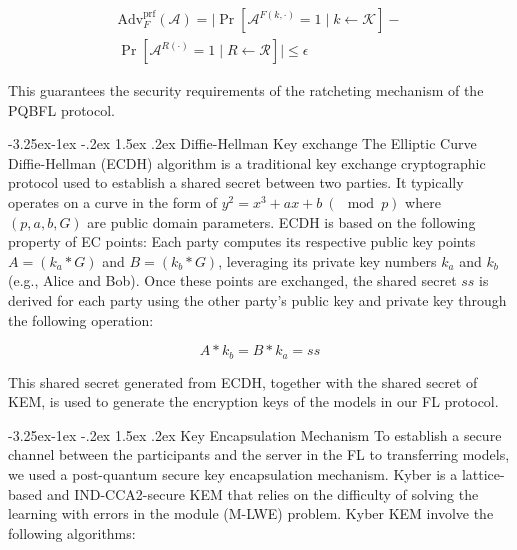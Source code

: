 \documentclass[a4paper,fleqn]{cas-dc}
\makeatletter
\renewcommand\subsubsection{\@startsection{subsubsection}{3}{\z@}%
   {-3.25ex\@plus -1ex \@minus -.2ex}%
   {1.5ex \@plus .2ex}%
   {\normalfont\normalsize}} %
\makeatother
\begin{document}
\begin{equation}
    \begin{aligned}
        \text{Adv}_{F}^{\text{prf}}(\mathcal{A}) = \Big| \Pr \left[ \mathcal{A}^{F(k, \cdot)} = 1 \mid k \leftarrow \mathcal{K} \right] - \\ 
        \Pr \left[ \mathcal{A}^{R(\cdot)} = 1 \mid R \leftarrow \mathcal{R} \right] \Big| \leq \epsilon 
    \end{aligned}
\end{equation}

This guarantees the security requirements of the ratcheting mechanism of the PQBFL protocol.

\subsubsection{Diffie-Hellman Key exchange}
The Elliptic Curve Diffie-Hellman (ECDH) algorithm is a traditional key exchange cryptographic protocol used to establish a shared secret between two parties.
It typically operates on a curve in the form of $y^2=x^3+ax+b\:(\!\!\!\!\mod {p})$ where $(p,a,b,G)$ are public domain parameters. 
ECDH is based on the following property of EC points: Each party computes its respective public key points $A=(k_{a} * G)$ and $B=(k_{b} * G)$, leveraging its private key numbers $k_{a}$ and $k_{b}$ (e.g., Alice and Bob).
Once these points are exchanged, the shared secret $ss$ is derived for each party using the other party's public key and private key through the following operation:

\begin{equation}
    A * k_{b} = B * k_{a}= ss
\end{equation}

This shared secret generated from ECDH, together with the shared secret of KEM, is used to generate the encryption keys of the models in our FL protocol.

\subsubsection{Key Encapsulation Mechanism}
To establish a secure channel between the participants and the server in the FL to transferring models, we used a post-quantum secure key encapsulation mechanism.
Kyber \citep{kyber} is a lattice-based and IND-CCA2-secure KEM that relies on the difficulty of solving the learning with errors in the module (M-LWE) problem. Kyber KEM involve the following algorithms:
\end{document}
